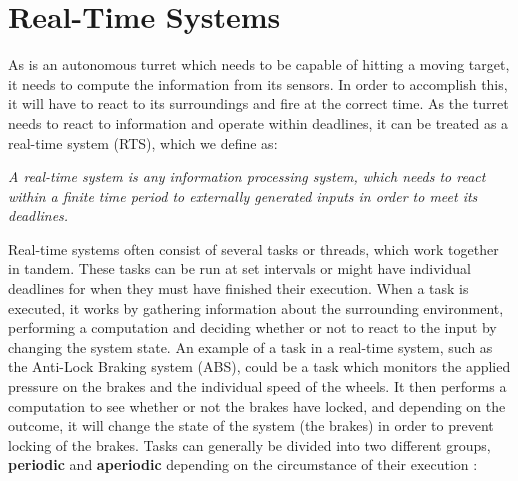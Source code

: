 \section{Real-Time Systems}\label{rts}


As \name is an autonomous turret which needs to be capable of hitting a moving
target, it needs to compute the information from its sensors. In order to
accomplish this, it will have to react to its surroundings and fire at the
correct time. As the turret needs to react to
information and operate within deadlines, it can be treated as a real-time
system (RTS), which we define as:

\begin{center}
\begin{minipage}{0.8\linewidth}
\textit{A real-time system is any information processing system, which needs to
react within a finite time period to externally generated inputs in order to
meet its deadlines.}
\end{minipage}
\end{center} 

Real-time systems often consist of several tasks or threads, which work
together in tandem. These tasks can be run at set intervals or might have
individual deadlines for when they must have finished their execution. When a
task is executed, it works by gathering information about the surrounding
environment, performing a computation and deciding whether or not to react to
the input by changing the system state. An example of a task in a real-time
system, such as the Anti-Lock Braking system (ABS), could be a task which
monitors the applied pressure on the brakes and the individual speed of the wheels. It
then performs a computation to see whether or not the brakes have locked, and
depending on the outcome, it will change the state of the system (the brakes) in
order to prevent locking of the brakes. Tasks can generally be divided into two
different groups, \textbf{periodic} and \textbf{aperiodic} depending on the
circumstance of their execution \citep[ch.1A]{Realtime}:

